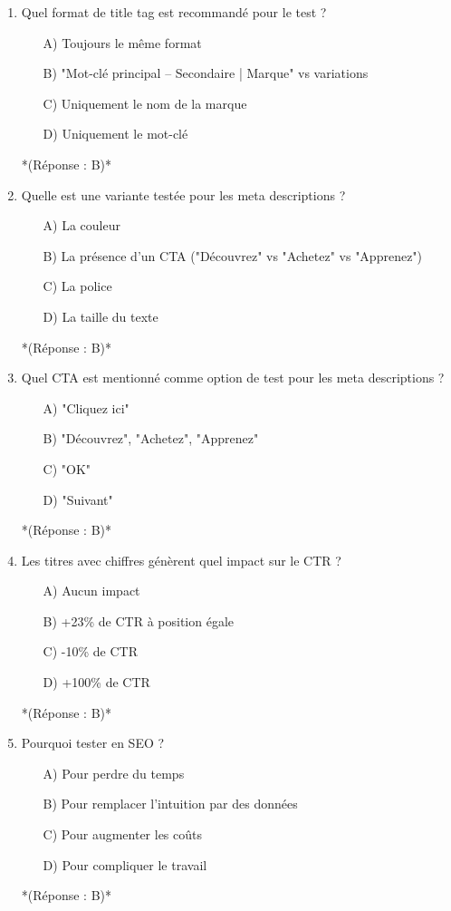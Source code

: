 \documentclass[12pt,a4paper,twoside]{report}
\begin{document}
\begin{enumerate}
    \item Quel format de title tag est recommandé pour le test ?
    \begin{itemize}
        \item[A)] Toujours le même format
        \item[B)] "Mot-clé principal -- Secondaire | Marque" vs variations
        \item[C)] Uniquement le nom de la marque
        \item[D)] Uniquement le mot-clé
    \end{itemize}
    *(Réponse : B)*

    \item Quelle est une variante testée pour les meta descriptions ?
    \begin{itemize}
        \item[A)] La couleur
        \item[B)] La présence d'un CTA ("Découvrez" vs "Achetez" vs "Apprenez")
        \item[C)] La police
        \item[D)] La taille du texte
    \end{itemize}
    *(Réponse : B)*

    \item Quel CTA est mentionné comme option de test pour les meta descriptions ?
    \begin{itemize}
        \item[A)] "Cliquez ici"
        \item[B)] "Découvrez", "Achetez", "Apprenez"
        \item[C)] "OK"
        \item[D)] "Suivant"
    \end{itemize}
    *(Réponse : B)*

    \item Les titres avec chiffres génèrent quel impact sur le CTR ?
    \begin{itemize}
        \item[A)] Aucun impact
        \item[B)] +23\% de CTR à position égale
        \item[C)] -10\% de CTR
        \item[D)] +100\% de CTR
    \end{itemize}
    *(Réponse : B)*

    \item Pourquoi tester en SEO ?
    \begin{itemize}
        \item[A)] Pour perdre du temps
        \item[B)] Pour remplacer l'intuition par des données
        \item[C)] Pour augmenter les coûts
        \item[D)] Pour compliquer le travail
    \end{itemize}
    *(Réponse : B)*


\end{enumerate}
\end{document}

